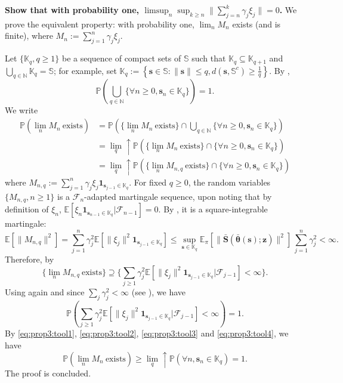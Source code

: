 \documentclass{article}
\def\eqdef{:=}
\def\nset{{\mathbb{N}}}
\def\F{\mathcal{F}}
\def\param{\vtheta}
\def\barparam{\bar{\param}}
\def\bars{\bar{\vS}}
\def\1{\bm{1}}
\def\rvz{{\mathbf{z}}}
\def\vtheta{{\bm{\theta}}}
\def\vs{{\bm{s}}}
\def\vS{{\bm{S}}}
\def\sS{{\mathbb{S}}}
\newcommand{\E}{\mathbb{E}}
\begin{document}
{\bf Show that with probability one, $\limsup_n \sup_{k \geq n} \| \sum_{j=n}^k \gamma_j \xi_j\| =0$.} We prove the equivalent property: with probability one, $\lim_n M_n$ exists (and is finite), where $M_n \eqdef \sum_{j = 1}^n \gamma_j \xi_j$.  

Let $\{\mathbb{K}_q, q \geq 1\}$ be a sequence of compact sets of $\sS$ such that $\mathbb{K}_q \subseteq  \mathbb{K}_{q+1}$  and $\bigcup_{q \in \nset} \mathbb{K}_q = \sS$; for example, set $\mathbb{K}_q \eqdef \left\{\vs \in \sS: \|\vs\| \leq q, d(\vs, \sS^c) \geq \frac{1}{q} \right\}$.  By , 
\begin{equation}\label{eq:prop3:tool4}
\mathbb{P}\left( \bigcup_{q \in \nset} \{\forall n \geq 0, \vs_n \in \mathbb{K}_q \}\right)= 1.
\end{equation}
We write
\begin{align}
\mathbb{P} \left( \lim_n M_n \ \text{exists} \right) & = \mathbb{P} \left( \{ \lim_n M_n \ \text{exists} \} \cap  \bigcup_{q \in \nset} \{\forall n \geq 0, \vs_n \in \mathbb{K}_q \}  \right)  \nonumber \\
& = \lim_q \uparrow \mathbb{P} \left( \{ \lim_n M_n \ \text{exists} \} \cap  \{\forall n \geq 0, \vs_n \in \mathbb{K}_q \}  \right) \nonumber \\
& = \lim_q \uparrow \mathbb{P} \left( \{ \lim_n M_{n,q} \ \text{exists} \} \cap  \{\forall n \geq 0, \vs_n \in \mathbb{K}_q \}  \right) \label{eq:prop3:tool1}
\end{align}
where $M_{n,q} \eqdef \sum_{j=1}^n \gamma_j \xi_j \1_{\vs_{j-1} \in \mathbb{K}_q}$. For fixed $q \geq 0$, the random variables $\{M_{n,q}, n \geq 1 \}$ is a $\F_n$-adapted martingale sequence, upon noting that by definition of $\xi_n$, $\E\left[ \xi_n \1_{\vs_{n-1} \in \mathbb{K}_q} \vert \F_{n-1} \right] =0$. By , it is a square-integrable martingale:
\[
\E\left[ \| M_{n,q} \|^2 \right] = \sum_{j=1}^n \gamma_j^2 \E\left[ \| \xi_j \|^2 \1_{\vs_{j-1} \in \mathbb{K}_q} \right] \leq  \sup_{\vs \in \mathbb{K}_q} \E_\pi\left[ \| \bars\left(\barparam\left(\vs\right);\rvz\right)\|^2 \right] \, \sum_{j=1}^n \gamma_j^2 < \infty.
\]
Therefore, by \cite[Theorem 2.15]{hall:heyde} 
\begin{equation}\label{eq:prop3:tool2}
\{\lim_n M_{n,q} \ \text{exists} \} \supseteq \{ \sum_{j \geq 1} \gamma_j^2  \E\left[ \|\xi_j \|^2 \1_{ \vs_{j-1} \in \mathbb{K}_q} \vert \F_{j-1} \right]< \infty \}.
\end{equation}
Using again   and since $\sum_j \gamma_j^2< \infty$ (see ), we have 
\begin{equation}\label{eq:prop3:tool3}
\mathbb{P}\left( \sum_{j \geq 1} \gamma_j^2  \E\left[ \|\xi_j \|^2 \1_{ \vs_{j-1} \in \mathbb{K}_q}  \vert \F_{j-1} \right]< \infty\right) =1.
\end{equation}
        By  \cref{eq:prop3:tool1}, \cref{eq:prop3:tool2}, \cref{eq:prop3:tool3} and \cref{eq:prop3:tool4}, we have
\[
\mathbb{P} \left( \lim_n M_n \ \text{exists} \right)  \geq \lim_q \uparrow \mathbb{P} \left( \forall n, \vs_n \in \mathbb{K}_q \right) =1.
\]
The proof is concluded.
\end{document}
